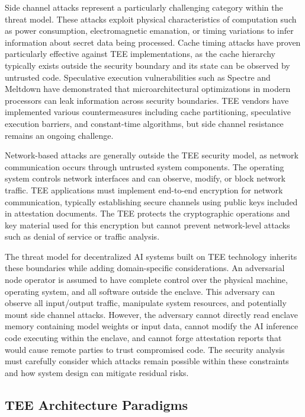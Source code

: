 Side channel attacks represent a particularly challenging category within the threat model. These attacks exploit physical characteristics of computation such as power consumption, electromagnetic emanation, or timing variations to infer information about secret data being processed. Cache timing attacks have proven particularly effective against TEE implementations, as the cache hierarchy typically exists outside the security boundary and its state can be observed by untrusted code. Speculative execution vulnerabilities such as Spectre and Meltdown have demonstrated that microarchitectural optimizations in modern processors can leak information across security boundaries. TEE vendors have implemented various countermeasures including cache partitioning, speculative execution barriers, and constant-time algorithms, but side channel resistance remains an ongoing challenge.

Network-based attacks are generally outside the TEE security model, as network communication occurs through untrusted system components. The operating system controls network interfaces and can observe, modify, or block network traffic. TEE applications must implement end-to-end encryption for network communication, typically establishing secure channels using public keys included in attestation documents. The TEE protects the cryptographic operations and key material used for this encryption but cannot prevent network-level attacks such as denial of service or traffic analysis.

The threat model for decentralized AI systems built on TEE technology inherits these boundaries while adding domain-specific considerations. An adversarial node operator is assumed to have complete control over the physical machine, operating system, and all software outside the enclave. This adversary can observe all input/output traffic, manipulate system resources, and potentially mount side channel attacks. However, the adversary cannot directly read enclave memory containing model weights or input data, cannot modify the AI inference code executing within the enclave, and cannot forge attestation reports that would cause remote parties to trust compromised code. The security analysis must carefully consider which attacks remain possible within these constraints and how system design can mitigate residual risks.

\subsection{TEE Architecture Paradigms}


